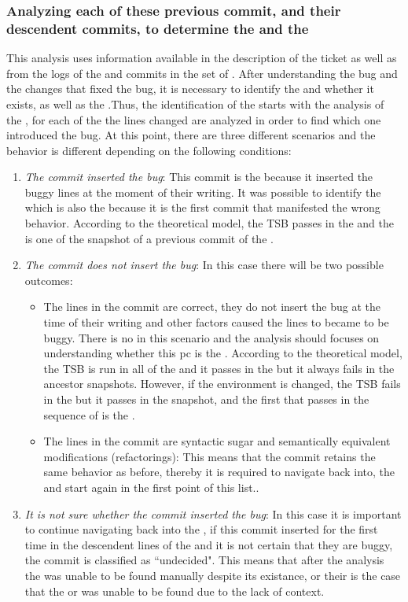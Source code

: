 \documentclass[a4paper, 12pt]{book}
\begin{document}
\subsubsection{Analyzing each of these previous commit, and their descendent commits, to determine the \BIC and the \FFC}

This analysis uses information available in the description of the ticket as well as from the logs of the \BFC and commits in the set of . After understanding the bug and the changes that fixed the bug, it is necessary to identify the \BIC and whether it exists, as well as the \FFC.Thus, the identification of the \BIC starts with the analysis of the , for each of the  the lines changed are analyzed in order to find which one introduced the bug. At this point, there are three different scenarios and the behavior is different depending on the following conditions:

\begin{enumerate}
	\item \textit{The commit inserted the bug}: This commit is the \BIC because it inserted the buggy lines at the moment of their writing. It was possible to identify the \BIC which is also the \FFC because it is the first commit that manifested the wrong behavior. According to the theoretical model, the TSB passes in the \BFC and the \BIS is one of the snapshot of a previous commit of the \BFC.
	\item \textit{The commit does not insert the bug}: In this case there will be two possible outcomes:
		\begin{itemize}
			\item The lines in the commit are correct, they do not insert the bug at the time of their writing and other factors caused the lines to became to be buggy. There is no \BIC in this scenario and the analysis should focuses on understanding whether this pc is the \FFC. According to the theoretical model, the TSB is run in all of the  and it passes in the \BFC but it always fails in the ancestor snapshots. However, if the environment is changed, the TSB fails in the \BFC but it passes in the snapshot, and the first \BIS that passes in the sequence of \BIS is the \FFC.
			\item The lines in the commit are syntactic sugar and semantically equivalent modifications (refactorings): This means that the commit retains the same behavior as before, thereby it is required to navigate back into, the  and start again in the first point of this list..
		\end{itemize}
	\item \textit{It is not sure whether the commit inserted the bug}: In this case it is important to continue navigating back into the , if this commit inserted for the first time in the descendent lines of the  and it is not certain that they are buggy, the commit is classified as ``undecided". This means that after the analysis the \BIC was unable to be found manually despite its existance, or their is the case that the \FFC or \BIC was unable to be found due to the lack of context.
\end{enumerate}
\end{document}
